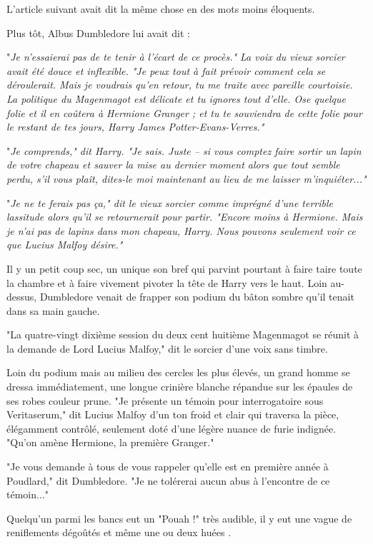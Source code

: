 L'article suivant avait dit la même chose en des mots moins éloquents.

Plus tôt, Albus Dumbledore lui avait dit :

"\emph{Je n'essaierai pas de te tenir à l'écart de ce procès." La voix du vieux sorcier avait été douce et inflexible. "Je peux tout à fait prévoir comment cela se déroulerait. Mais je voudrais qu'en retour, tu me traite avec pareille courtoisie. La politique du Magenmagot est délicate et tu ignores tout d'elle. Ose quelque folie et il en coûtera à Hermione Granger ; et tu te souviendra de cette folie pour le restant de tes jours, Harry James Potter-Evans-Verres."} 

"\emph{Je comprends," dit Harry. "Je sais. Juste – si vous comptez faire sortir un lapin de votre chapeau et sauver la mise au dernier moment alors que tout semble perdu, s'il vous plaît, dites-le moi maintenant au lieu de me laisser m'inquiéter..."} 

"\emph{Je ne te ferais pas ça," dit le vieux sorcier comme imprégné d'une terrible lassitude alors qu'il se retournerait pour partir. "Encore moins à Hermione. Mais je n'ai pas de lapins dans mon chapeau, Harry. Nous pouvons seulement voir ce que Lucius Malfoy désire."} 

Il y un petit coup sec, un unique son bref qui parvint pourtant à faire taire toute la chambre et à faire vivement pivoter la tête de Harry vers le haut. Loin au-dessus, Dumbledore venait de frapper son podium du bâton sombre qu'il tenait dans sa main gauche.

"La quatre-vingt dixième session du deux cent huitième Magenmagot se réunit à la demande de Lord Lucius Malfoy," dit le sorcier d'une voix sans timbre.

Loin du podium mais au milieu des cercles les plus élevés, un grand homme se dressa immédiatement, une longue crinière blanche répandue sur les épaules de ses robes couleur prune. "Je présente un témoin pour interrogatoire sous Veritaserum," dit Lucius Malfoy d'un ton froid et clair qui traversa la pièce, élégamment contrôlé, seulement doté d'une légère nuance de furie indignée. "Qu'on amène Hermione, la première Granger."

"Je vous demande à tous de vous rappeler qu'elle est en première année à Poudlard," dit Dumbledore. "Je ne tolérerai aucun abus à l'encontre de ce témoin..."

Quelqu'un parmi les bancs eut un "Pouah !" très audible, il y eut une vague de reniflements dégoûtés et même une ou deux huées .

